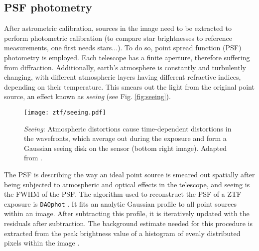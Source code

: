 \subsection{PSF photometry} \label{psfphot}
After astrometric calibration, sources in the image need to be extracted to perform photometric calibration (to compare star brightnesses to reference measurements, one first needs stars...). To do so, point spread function (PSF) photometry is employed. Each telescope has a finite aperture, therefore suffering from diffraction. Additionally, earth's atmosphere is constantly and turbulently changing, with different atmospheric layers having different refractive indices, depending on their temperature. This smears out the light from the original point source, an effect known as \textit{seeing} (see Fig. \ref{fig:seeing}).

\begin{figure}[h!]
    \texttt{[image: ztf/seeing.pdf]}
    \caption[Seeing]{\textit{Seeing}: Atmospheric distortions cause time-dependent distortions in the wavefronts, which average out during the exposure and form a Gaussian seeing disk on the sensor (bottom right image). Adapted from \cite{Chromey2016}.}
\end{figure}

The PSF is describing the way an ideal point source is smeared out spatially after being subjected to atmospheric and optical effects in the telescope, and seeing is the FWHM of the PSF. The algorithm used to reconstruct the PSF of a ZTF exposure is \texttt{DAOphot} . It fits an analytic Gaussian profile to all point sources within an image. After subtracting this profile, it is iteratively updated with the residuals after subtraction. The background estimate needed for this procedure is extracted from the peak brightness value of a histogram of evenly distributed pixels within the image \cite{Stetson1987}.

